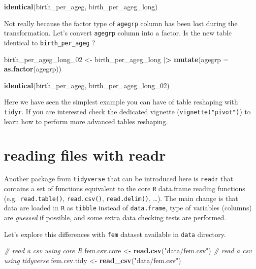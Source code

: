 \documentclass[
]{book}
\newenvironment{Shaded}{\begin{snugshade}}{\end{snugshade}}
\newcommand{\AttributeTok}[1]{\textcolor[rgb]{0.13,0.29,0.53}{#1}}
\newcommand{\CommentTok}[1]{\textcolor[rgb]{0.56,0.35,0.01}{\textit{#1}}}
\newcommand{\FunctionTok}[1]{\textcolor[rgb]{0.13,0.29,0.53}{\textbf{#1}}}
\newcommand{\NormalTok}[1]{#1}
\newcommand{\OtherTok}[1]{\textcolor[rgb]{0.56,0.35,0.01}{#1}}
\newcommand{\SpecialCharTok}[1]{\textcolor[rgb]{0.81,0.36,0.00}{\textbf{#1}}}
\newcommand{\StringTok}[1]{\textcolor[rgb]{0.31,0.60,0.02}{#1}}
\begin{document}
\begin{Shaded}
\begin{Highlighting}[]
\FunctionTok{identical}\NormalTok{(birth\_per\_ageg, birth\_per\_ageg\_long)}
\end{Highlighting}
\end{Shaded}

Not really because the factor type of \texttt{agegrp} column has been lost during the transformation.
Let's convert \texttt{agegrp} column into a factor. Is the new table identical to \texttt{birth\_per\_ageg} ?

\begin{Shaded}
\begin{Highlighting}[]
\NormalTok{birth\_per\_ageg\_long\_02 }\OtherTok{\textless{}{-}}
\NormalTok{  birth\_per\_ageg\_long }\SpecialCharTok{|\textgreater{}}
  \FunctionTok{mutate}\NormalTok{(}\AttributeTok{agegrp =} \FunctionTok{as.factor}\NormalTok{(agegrp))}

\FunctionTok{identical}\NormalTok{(birth\_per\_ageg, birth\_per\_ageg\_long\_02)}
\end{Highlighting}
\end{Shaded}

Here we have seen the simplest example you can have of table reshaping with \texttt{tidyr}. If you are interested check the dedicated vignette (\texttt{vignette("pivot")}) to learn how to perform more advanced tables reshaping.

\section{reading files with readr}\label{reading-files-with-readr}

Another package from \texttt{tidyverse} that can be introduced here is \texttt{readr} that contains a set of functions equivalent to the core \texttt{R} data.frame reading functions (e.g.~\texttt{read.table()}, \texttt{read.csv()}, \texttt{read.delim()}, \ldots). The main change is that data are loaded in \texttt{R} as \texttt{tibble} instead of \texttt{data.frame}, type of variables (columns) are \emph{guessed} if possible, and some extra data checking tests are performed.

Let's explore this differences with \texttt{fem} dataset available in \texttt{data} directory.

\begin{Shaded}
\begin{Highlighting}[]
\CommentTok{\# read a csv using core R}
\NormalTok{fem.csv.core }\OtherTok{\textless{}{-}} \FunctionTok{read.csv}\NormalTok{(}\StringTok{"data/fem.csv"}\NormalTok{)}
\CommentTok{\# read a csv using tidyverse}
\NormalTok{fem.csv.tidy }\OtherTok{\textless{}{-}} \FunctionTok{read\_csv}\NormalTok{(}\StringTok{"data/fem.csv"}\NormalTok{)}
\end{Highlighting}
\end{Shaded}
\end{document}
